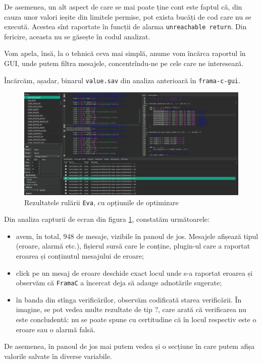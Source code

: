 De asemenea, un alt aspect de care se mai poate ține cont este faptul că, din cauza
unor valori ieșite din limitele permise, pot exista bucăți de cod care nu se
execută. Acestea sînt raportate în funcții de alarma \texttt{unreachable return}.
Din fericire, aceasta nu se găsește în codul analizat.

Vom apela, însă, la o tehnică ceva mai simplă, anume vom încărca raportul în GUI,
unde putem filtra mesajele, concentrîndu-ne pe cele care ne interesează.

Încărcăm, așadar, binarul \texttt{value.sav} din analiza anterioară în \texttt{frama-c-gui}.
\begin{figure}[!htbp]
  \centering
    \includegraphics[width=1\textwidth]{img/framagui2}
    \caption{Rezultatele rulării \texttt{Eva}, cu opțiunile de optimizare}
  \label{fig:eva}
\end{figure}

Din analiza capturii de ecran din figura \ref{fig:eva}, constatăm următoarele:
\begin{itemize}
\item avem, în total, 948 de mesaje, vizibile în panoul de jos. Mesajele afișează tipul
  (eroare, alarmă etc.), fișierul sursă care le conține, plugin-ul care a raportat eroarea
  și conținutul mesajului de eroare;
\item click pe un mesaj de eroare deschide exact locul unde s-a raportat eroarea
  și observăm că \texttt{FramaC} a încercat deja să adauge adnotările sugerate;
\item în banda din stînga verificărilor, observăm codificată starea verificării. În imagine,
  se pot vedea multe rezultate de tip $\boxed{?}$, care arată că verificarea nu este
  concludentă: nu se poate spune cu certitudine că în locul respectiv este o eroare sau o
  alarmă falsă.
\end{itemize}

De asemenea, în panoul de jos mai putem vedea și o secțiune în care putem afișa
valorile salvate în diverse variabile.

